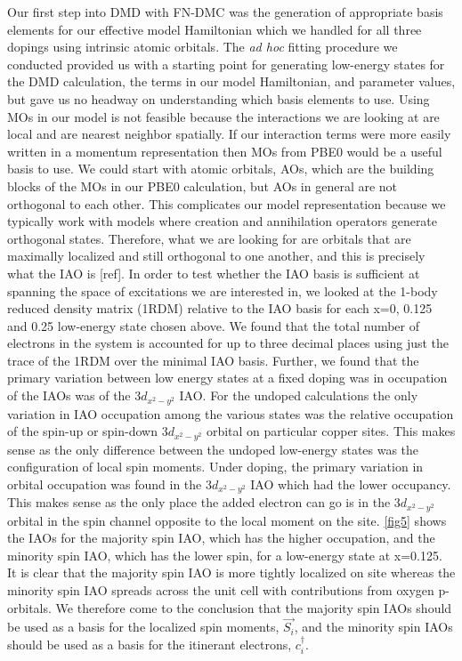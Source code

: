 \documentclass{article}
\begin{document}
Our first step into DMD with FN-DMC was the generation of appropriate basis elements for our effective model Hamiltonian which we handled for all three dopings using intrinsic atomic orbitals. The \textit{ad hoc} fitting procedure we conducted provided us with a starting point for generating low-energy states for the DMD calculation, the terms in our model Hamiltonian, and parameter values, but gave us no headway on understanding which basis elements to use. Using MOs in our model is not feasible because the interactions we are looking at are local and are nearest neighbor spatially. If our interaction terms were more easily written in a momentum representation then MOs from PBE0 would be a useful basis to use. We could start with atomic orbitals, AOs, which are the building blocks of the MOs in our PBE0 calculation, but AOs in general are not orthogonal to each other. This complicates our model representation because we typically work with models where creation and annihilation operators generate orthogonal states. Therefore, what we are looking for are orbitals that are maximally localized and still orthogonal to one another, and this is precisely what the IAO is [ref]. In order to test whether the IAO basis is sufficient at spanning the space of excitations we are interested in, we looked at the 1-body reduced density matrix (1RDM) relative to the IAO basis for each x=0, 0.125 and 0.25 low-energy state chosen above. We found that the total number of electrons in the system is accounted for up to three decimal places using just the trace of the 1RDM over the minimal IAO basis. Further, we found that the primary variation between low energy states at a fixed doping was in occupation of the IAOs was of the 3$d_{x^2-y^2}$ IAO. For the undoped calculations the only variation in IAO occupation among the various states was the relative occupation of the spin-up or spin-down 3$d_{x^2-y^2}$ orbital on particular copper sites. This makes sense as the only difference between the undoped low-energy states was the configuration of local spin moments. Under doping, the primary variation in orbital occupation was found in the 3$d_{x^2-y^2}$ IAO which had the lower occupancy. This makes sense as the only place the added electron can go is in the 3$d_{x^2-y^2}$ orbital in the spin channel opposite to the local moment on the site. \ref{fig5} shows the IAOs for the majority spin IAO, which has the higher occupation, and the minority spin IAO, which has the lower spin, for a low-energy state at x=0.125. It is clear that the majority spin IAO is more tightly localized on site whereas the minority spin IAO spreads across the unit cell with contributions from oxygen p-orbitals. We therefore come to the conclusion that the majority spin IAOs should be used as a basis for the localized spin moments, $\vec{S_i}$, and the minority spin IAOs should be used as a basis for the itinerant electrons, $c_i^\dagger$. 
\end{document}

